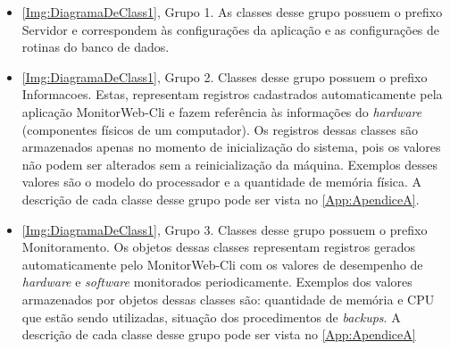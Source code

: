 \begin{itemize}
		\item \autoref{Img:DiagramaDeClass1}, Grupo 1. As classes desse grupo possuem o prefixo Servidor e correspondem às configurações da aplicação e as configurações de rotinas do banco de dados.
		\item \autoref{Img:DiagramaDeClass1}, Grupo 2. Classes desse grupo possuem o prefixo Informacoes. Estas, representam registros cadastrados automaticamente pela aplicação MonitorWeb-Cli e fazem referência às informações do \textit{hardware} (componentes físicos de um computador). Os registros dessas classes são armazenados apenas no momento de inicialização do sistema, pois os valores não podem ser alterados sem a reinicialização da máquina. Exemplos desses valores são o modelo do processador e a quantidade de memória física. A descrição de cada classe desse grupo pode ser vista no \autoref{App:ApendiceA}.
		\item \autoref{Img:DiagramaDeClass1}, Grupo 3. Classes desse grupo possuem o prefixo Monitoramento. Os objetos dessas classes representam registros gerados automaticamente pelo MonitorWeb-Cli com os valores de desempenho de \textit{hardware} e \textit{software} monitorados periodicamente. Exemplos dos valores armazenados por objetos dessas classes são: quantidade de memória e CPU que estão sendo utilizadas, situação dos procedimentos de \textit{backups}. A descrição de cada classe desse grupo pode ser vista no \autoref{App:ApendiceA}
\end{itemize}


